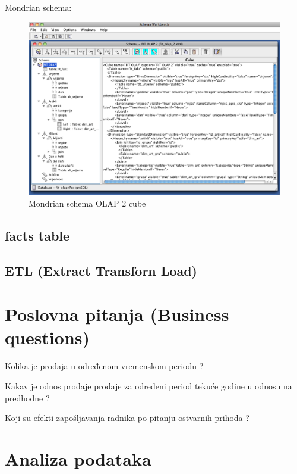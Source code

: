 \documentclass[times, utf8, seminar]{fit}
\begin{document}
Mondrian schema:

\begin{figure}[h]
\centering
\includegraphics[width=15cm]{img/fit_olap_mondrian_schema}
\caption{Mondrian schema OLAP 2 cube}
\end{figure}




\subsection{facts table}



\subsection{ETL (Extract Transforn Load)}




\section{Poslovna pitanja (Business questions)}

Kolika je prodaja u određenom vremenskom periodu ?

Kakav je odnos prodaje prodaje za određeni period tekuće godine u odnosu na predhodne ?

Koji su efekti zapošljavanja radnika po pitanju ostvarnih prihoda ?


\section{Analiza podataka}

\end{document}
